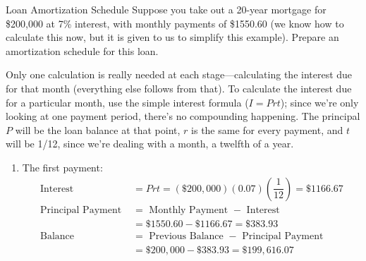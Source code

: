 \begin{example}[https://www.youtube.com/watch?v=bgFXXvgNB0g]{Loan Amortization Schedule}
Suppose you take out a 20-year mortgage for \$200,000 at 7\% interest, with monthly payments of \$1550.60 (we know how to calculate this now, but it is given to us to simplify this example).  Prepare an amortization schedule for this loan.

\sol
Only one calculation is really needed at each stage---calculating the interest due for that month (everything else follows from that).  To calculate the interest due for a particular month, use the simple interest formula ($I=Prt$); since we're only looking at one payment period, there's no compounding happening.  The principal $P$ will be the loan balance at that point, $r$ is the same for every payment, and $t$ will be 1/12, since we're dealing with a month, a twelfth of a year.
\begin{enumerate}
\item The first payment:
\begin{align*}
\textrm{Interest } &= Prt = (\$200,000)(0.07)\left(\dfrac{1}{12}\right) = \$1166.67\\
\textrm{Principal Payment } &= \textrm{ Monthly Payment } - \textrm{ Interest}\\
&= \$1550.60 - \$1166.67 = \$383.93\\
\textrm{Balance } &= \textrm{ Previous Balance } - \textrm{ Principal Payment}\\
&= \$200,000 - \$383.93 = \$199,616.07
\end{align*}


\end{enumerate}
\end{example}
